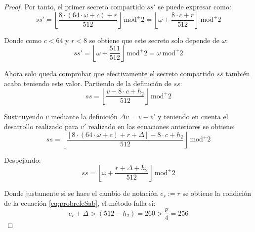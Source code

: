 \begin{proof}
	Por tanto, el primer secreto compartido \(ss'\) se puede expresar como:
	\begin{equation}
		ss'=\left\lfloor \dfrac{8\cdot (64\cdot \omega+c)+r}{512} \right\rfloor \ \text{mod}^{+}{2}=\left\lfloor \omega +\dfrac{8\cdot c+r}{512} \right\rfloor \ \text{mod}^{+}{2}
	\end{equation}
	
	Donde como \(c < 64\) y \(r < 8\) se obtiene que este secreto solo depende de $\omega$:
	\begin{equation}
		ss'=\left\lfloor \omega +\dfrac{511}{512} \right\rfloor \ \text{mod}^{+}{2}= \omega \ \text{mod}^{+}{2}
	\end{equation}
	
	Ahora solo queda comprobar que efectivamente el secreto compartido \(ss\) también acaba teniendo este valor. Partiendo de la definición de \(ss\):
	\begin{equation}
		ss=\left\lfloor \dfrac{v-8\cdot c+ h_2}{512}\right\rfloor \ \text{mod}^{+}{2}
	\end{equation}
	
	Sustituyendo \(v\) mediante la definición $\Delta v= v - v'$ y teniendo en cuenta el desarrollo realizado para \(v'\) realizado en las ecuaciones anteriores se obtiene:
	\begin{equation}
		ss=\left\lfloor \dfrac{[8\cdot(64\cdot \omega+c)+r+\Delta]-8\cdot c+ h_2}{512}\right\rfloor \ \text{mod}^{+}{2}
	\end{equation}
	
	Despejando:
	\begin{equation}
		ss=\left\lfloor \omega +\dfrac{r+\Delta+ h_2}{512}\right\rfloor \ \text{mod}^{+}{2}
	\end{equation}
	
	Donde justamente si se hace el cambio de notación \(e_r:=r\) se obtiene la condición de la ecuación \ref{eq:probrefeSab}, el método falla si:
	\begin{equation}
		e_r+\Delta > (512-h_2)= 260 >\dfrac{p}{4}=256
	\end{equation}
\end{proof}



